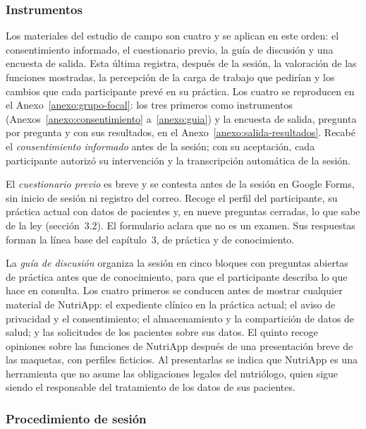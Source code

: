 \documentclass[12pt, a4paper]{article}
\begin{document}
\subsubsection{Instrumentos}
 
Los materiales del estudio de campo son cuatro y se aplican en este
orden: el consentimiento informado, el cuestionario previo, la guía de
discusión y una encuesta de salida. Esta última registra,
después de la sesión, la valoración de las funciones mostradas, la
percepción de la carga de trabajo que pedirían y los cambios que cada
participante prevé en su práctica. Los cuatro se reproducen en el
Anexo~\ref{anexo:grupo-focal}: los tres primeros como instrumentos
(Anexos~\ref{anexo:consentimiento} a~\ref{anexo:guia}) y la encuesta de
salida, pregunta por pregunta y con sus resultados, en el
Anexo~\ref{anexo:salida-resultados}. Recabé el \textit{consentimiento
informado} antes de la sesión; con su aceptación, cada
participante autorizó su intervención y la transcripción automática de
la sesión.
 
El \textit{cuestionario previo} es breve y se contesta antes de la
sesión en Google Forms, sin inicio de sesión ni registro del correo. Recoge el perfil del participante, su práctica actual con
datos de pacientes y, en nueve preguntas cerradas, lo que
sabe de la ley (sección~3.2). El formulario aclara que no es un examen. Sus respuestas forman la línea
base del capítulo~3, de práctica y de conocimiento.
 
La \textit{guía de discusión} organiza la sesión en cinco bloques con
preguntas abiertas de práctica antes que de conocimiento, para que el
participante describa lo que hace en consulta. Los cuatro primeros se
conducen antes de mostrar cualquier material de NutriApp: el expediente
clínico en la práctica actual; el aviso de privacidad y el
consentimiento; el almacenamiento y la compartición de datos de salud;
y las solicitudes de los pacientes sobre sus datos. El quinto recoge
opiniones sobre las funciones de NutriApp después de una presentación
breve de las maquetas, con perfiles ficticios. Al presentarlas se
indica que NutriApp es una herramienta que no asume las obligaciones
legales del nutriólogo, quien sigue siendo el responsable del
tratamiento de los datos de sus pacientes.
 

 
\subsubsection{Procedimiento de sesión}
 
\end{document}
